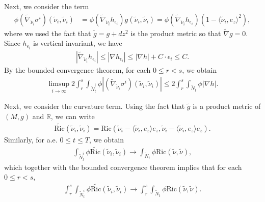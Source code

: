 \documentclass[11pt, letterpaper]{amsart}
\theoremstyle{definition}
\theoremstyle{remark}
\begin{document}
Next, we consider the term
\begin{align*}
	\phi (\tilde{\nabla }_{\tilde{\nu }_i} \sigma ^{i}) (\tilde{\nu }_i, \tilde{\nu }_i) &= \phi (\tilde{\nabla }_{\tilde{\nu }_i} h_{\epsilon _i})  g(\tilde{\nu }_i, \tilde{\nu }_i) = \phi (\tilde{\nabla }_{\tilde{\nu }_i} h_{\epsilon _i}) (1- \langle \tilde{\nu }_i, e_z \rangle^2),
\end{align*} 
where we used the fact that $\tilde{g}= g + dz^2$ is the product metric so that $\tilde{\nabla } g =0$.
Since $h_{\epsilon _i}$ is vertical invariant, we have
\begin{align*}
	|\tilde{\nabla }_{\tilde{\nu }_i} h_{\epsilon _i}| \leq  |\nabla h_{\epsilon _i}| \leq |\nabla h| + C\cdot \epsilon _i \leq C. 
\end{align*} 
By the bounded convergence theorem, for each $0\leq r <s$, we obtain
\begin{align*}
	\limsup_{i\to \infty}  2\int_{r}^{s} \int_{\tilde{N}^{i}_t} \phi |(\tilde{\nabla }_{\tilde{\nu }_i} \sigma ^{i}) (\tilde{\nu }_i, \tilde{\nu }_i)| \leq 2 \int_{r}^{s} \int_{\tilde{N}_{t}} \phi |\nabla h|.
\end{align*} 

Next, we consider the curvature term. Using the fact that $\tilde{g} $ is a product metric of $(M,g)$ and $\mathbb{R}$, we can write
\begin{align*}
	\tilde{\mathrm{Ric}}(\tilde{\nu }_i, \tilde{\nu }_i) = \mathrm{Ric}( \tilde{\nu }_i - \langle \tilde{\nu }_i, e_z \rangle e_z, \tilde{\nu }_i - \langle \tilde{\nu }_i, e_z \rangle e_z).
\end{align*}
Similarly, for a.e. $0 \leq t \leq T$, we obtain
\begin{align*}
	\int_{\tilde{N}^{i}_t} \phi \tilde{\mathrm{Ric}}(\tilde{\nu }_i, \tilde{\nu }_i) \to \int_{\tilde{N}_t} \phi \mathrm{Ric}(\tilde{\nu }, \tilde{\nu }),
\end{align*} 
which together with the bounded convergence theorem implies that for each $0\leq r<s$,
\begin{align*}
	\int_{r}^{s }\int_{\tilde{N}^{i}_t} \phi \tilde{\mathrm{Ric}}(\tilde{\nu }_i, \tilde{\nu }_i) \to \int_{r}^{s} \int_{\tilde{N}_t} \phi \mathrm{Ric}(\tilde{\nu }, \tilde{\nu }).
\end{align*} 
\end{document}

